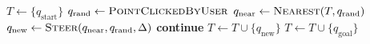 \documentclass[11pt]{article}
\begin{document}
\begin{algorithm}[t]
\caption{Rapidly-exploring Random Tree (RRT), user-chosen samples}
\begin{algorithmic}[1]
  \State $T \gets \{q_{\text{start}}\}$
  \Repeat
    \State $q_{\text{rand}} \gets \textsc{PointClickedByUser}$
    \State $q_{\text{near}} \gets \Call{Nearest}{T, q_{\text{rand}}}$
    \State $q_{\text{new}} \gets \Call{Steer}{q_{\text{near}}, q_{\text{rand}}, \Delta}$
      \State \textbf{continue}
    \EndIf
    \State $T \gets T \cup \{q_{\text{new}}\}$
      \State $T \gets T \cup \{q_{\text{goal}}\}$
      \State \Return {}
    \EndIf
\EndFunction
\end{algorithmic}
\end{algorithm}
\end{document}
